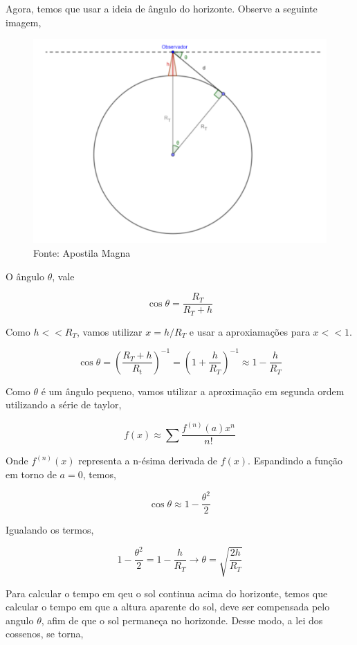\documentclass[11pt]{article}
\begin{document}
\begin{pproblem}
\begin{pssolution*}{}{}
\begin{alternativas}
        \item Agora, temos que usar a ideia de ângulo do horizonte. Observe a seguinte imagem, 
            \begin{figure}[H]
                \centering
                \includegraphics[width=0.90\linewidth]{imagens/angulohorizonte.png}
                \caption{Fonte: Apostila Magna}
            \end{figure}

            O ângulo \(\theta\), vale

            \[\cos\theta = \frac{R_T}{R_T+h}\]

            Como \(h<<R_T\), vamos utilizar \(x=h/R_T\) e usar a aproxiamações para \(x<<1\).

            \[\cos\theta = \left(\frac{R_T+h}{R_t}\right)^{-1} = \left(1+\frac{h}{R_T}\right)^{-1} \approx 1-\frac{h}{R_T}\]

            Como \(\theta\) é um ângulo pequeno, vamos utilizar a aproximação em segunda ordem utilizando a série de taylor, 

            \[f(x) \approx \sum\frac{f^{(n)}(a)x^n}{n!}\]

            Onde \(f^{(n)}(x)\) representa a n-ésima derivada de \(f(x)\). Espandindo a função em torno de \(a=0\), temos, 

            \[\cos\theta \approx 1 -\frac{\theta^2}{2}\]

            Igualando os termos, 

            \[1-\frac{\theta^2}{2} = 1-\frac{h}{R_T} \rightarrow \theta = \sqrt{\frac{2h}{R_T}}\]

            Para calcular o tempo em qeu o sol continua acima do horizonte, temos que calcular o tempo em que a altura aparente do sol, deve ser compensada pelo angulo \(\theta\), afim de que o sol permaneça no horizonde. Desse modo, a lei dos cossenos, se torna, 


\end{alternativas}
\end{pssolution*}
\end{pproblem}
\end{document}
